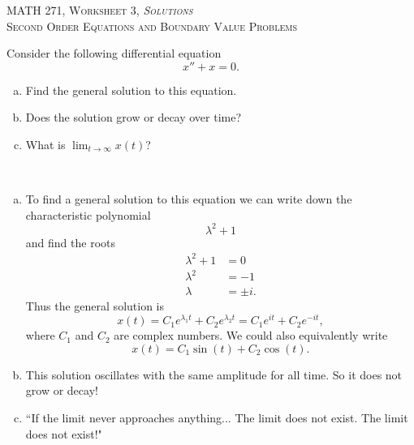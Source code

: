 \documentclass[12pt]{article} %
\begin{document}
\begin{center}
   \textsc{\large MATH 271, Worksheet 3, \emph{Solutions}}\\
   \textsc{Second Order Equations and Boundary Value Problems}
\end{center}
\vspace{.5cm}

\begin{problem}
Consider the following differential equation
\[
x''+x=0.
\]
\begin{enumerate}[(a)]
    \item Find the general solution to this equation.
    \item Does the solution grow or decay over time? 
    \item What is $\lim_{t\to \infty}x(t)$?
\end{enumerate}
\end{problem}

\begin{solution}~
\begin{enumerate}[(a)]
    \item To find a general solution to this equation we can write down the characteristic polynomial
    \[
    \lambda^2+1
    \]
    and find the roots
    \begin{align*}
        \lambda^2+1&=0\\
        \lambda^2&=-1\\
        \lambda&=\pm i.
    \end{align*}
    Thus the general solution is
    \[
    x(t)=C_1e^{\lambda_1 t}+C_2e^{\lambda_2 t}=C_1e^{it}+C_2e^{-it},
    \]
    where $C_1$ and $C_2$ are complex numbers. We could also equivalently write
    \[
    x(t)=C_1\sin(t)+C_2\cos(t).
    \]
    \item This solution oscillates with the same amplitude for all time. So it does not grow or decay!
    \item ``If the limit never approaches anything... The limit does not exist. The limit does not exist!"
\end{enumerate}
\end{solution}
\end{document}
